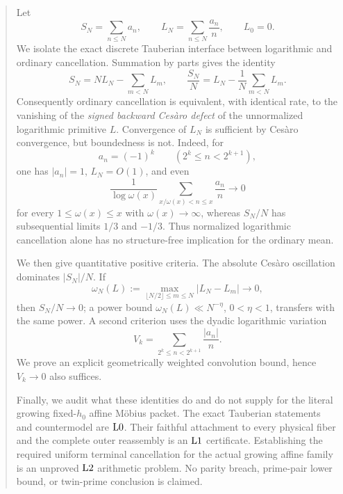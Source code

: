 \begin{abstract}
Let
\[
 S_N=\sum_{n\le N}a_n,\qquad
 L_N=\sum_{n\le N}\frac{a_n}{n},\qquad L_0=0.
\]
We isolate the exact discrete Tauberian interface between logarithmic
and ordinary cancellation.  Summation by parts gives the identity
\[
 \boxed{\quad
 S_N=NL_N-\sum_{m<N}L_m,\qquad
 \frac{S_N}{N}
 =L_N-\frac1N\sum_{m<N}L_m.
 \quad}
\]
Consequently ordinary cancellation is equivalent, with identical
rate, to the vanishing of the \emph{signed backward Ces\`aro defect}
of the unnormalized logarithmic primitive \(L\).  Convergence of
\(L_N\) is sufficient by Ces\`aro convergence, but boundedness is not.
Indeed, for
\[
 a_n=(-1)^k\qquad(2^k\le n<2^{k+1}),
\]
one has \(|a_n|=1\), \(L_N=O(1)\), and even
\[
 \frac{1}{\log\omega(x)}
 \sum_{x/\omega(x)<n\le x}\frac{a_n}{n}\longrightarrow0
\]
for every \(1\le\omega(x)\le x\) with \(\omega(x)\to\infty\), whereas
\(S_N/N\) has subsequential limits \(1/3\) and \(-1/3\).
Thus normalized logarithmic cancellation alone has no
structure-free implication for the ordinary mean.

We then give quantitative positive criteria.  The absolute Ces\`aro
oscillation dominates \(|S_N|/N\).  If
\[
 \omega_N(L):=
 \max_{\lfloor N/2\rfloor\le m\le N}|L_N-L_m|
\longrightarrow0,
\]
then \(S_N/N\to0\); a power bound
\(\omega_N(L)\ll N^{-\eta}\), \(0<\eta<1\), transfers with the same
power.  A second criterion uses the dyadic logarithmic variation
\[
 V_k=\sum_{2^k\le n<2^{k+1}}\frac{|a_n|}{n}.
\]
We prove an explicit geometrically weighted convolution bound, hence
\(V_k\to0\) also suffices.

Finally, we audit what these identities do and do not supply for the
literal growing fixed-\(h_0\) affine M\"obius packet.  The exact
Tauberian statements and countermodel are \(\Lzero\).  Their faithful
attachment to every physical fiber and the complete outer
reassembly is an \(\Lone\) certificate.  Establishing the required
uniform terminal cancellation for the actual growing affine family
is an unproved \(\Ltwo\) arithmetic problem.  No parity breach,
prime-pair lower bound, or twin-prime conclusion is claimed.
\end{abstract}
